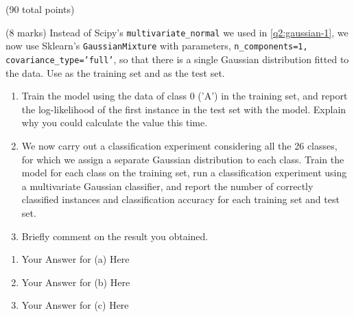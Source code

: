 \documentclass[12pt]{article}
\begin{document}
\begin{question}{(90 total points) \qTwoTitle}
\begin{subquestion}
  

\end{subquestion}

\begin{subquestion}{(8 marks)
    Instead of Scipy's {\tt multivariate\_normal} we used in \ref{q2:gaussian-1}, we now use Sklearn's {\tt GaussianMixture} with parameters, {\tt n\_components=1, covariance\_type='full'},
    so that there is a single Gaussian distribution fitted to the data.
    Use  as the training set and  as the test set.
  } \label{q2:gaussian-2}
  \begin{enumerate}\NARROWITEM
  \item Train the model using the data of class 0 ('A') in the training set, and report  the log-likelihood of the first instance in the test set with the model. Explain why you could calculate the value this time.
  \item We now carry out a classification experiment considering all the 26 classes, for which we assign a separate Gaussian distribution to each class.
    Train the model for each class on the training set, run a classification experiment using a multivariate Gaussian classifier, and report the number of correctly classified instances and classification accuracy for each training set and test set. 
  \item Briefly comment on the result you obtained.
  \end{enumerate}
   

  \begin{answerbox}{0.6\textheight}
    \begin{enumerate}
    \item Your Answer for (a) Here
    \item Your Answer for (b) Here
    \item Your Answer for (c) Here
    \end{enumerate}
  \end{answerbox}
  


\end{subquestion}


\end{question}
\end{document}
